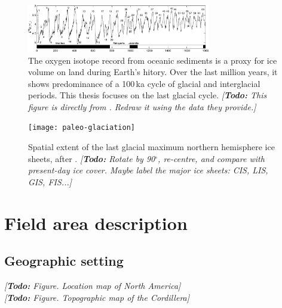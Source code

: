 \documentclass{article}
\newcommand{\todo}[1]{\emph{[\textbf{Todo:} #1]}}
\newcommand{\degree}[0]{\ensuremath{^{\circ}}}
\begin{document}
\begin{figure}
  \centering
  \includegraphics[width=80mm]{paleo-timeseries}
  \caption{The oxygen isotope record from oceanic sediments is a proxy for ice
           volume on land during Earth's hitory. Over the last million years,
           it shows predominance of a 100\,ka cycle of glacial and
           interglacial periods. This thesis focuses on the last glacial cycle.
           \todo{This figure is directly from \citet{Lisiecki.Raymo.2005}.
           Redraw it using the data they provide.}}
  \label{fig:palaeo-timeseries}
\end{figure}

\begin{figure}
  \centering
  \texttt{[image: paleo-glaciation]}
  \caption{Spatial extent of the last glacial maximum northern hemisphere ice
           sheets, after \citep{Ehlers.Gibbard.2007}.
           \todo{Rotate by 90\degree, re-centre, and compare with present-day
           ice cover. Maybe label the major ice sheets: CIS, LIS, GIS, FIS...}}
  \label{fig:palaeo-glaciation}
\end{figure}

\section{Field area description}

\subsection{Geographic setting}

\todo{Figure. Location map of North America}\\
\todo{Figure. Topographic map of the Cordillera}\\
\end{document}
